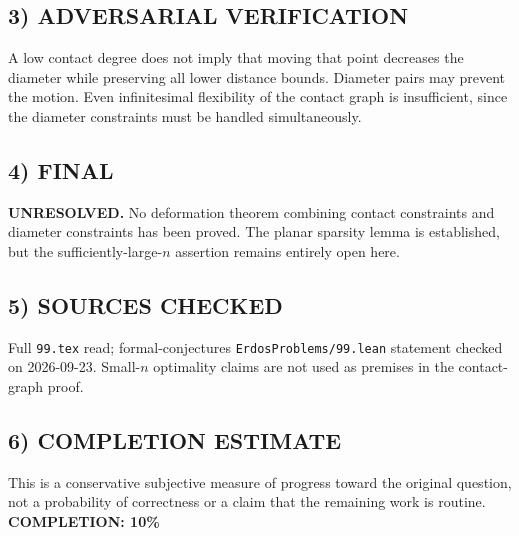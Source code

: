 \subsection{3) ADVERSARIAL VERIFICATION}
A low contact degree does not imply that moving that point decreases the diameter while preserving all lower distance bounds. Diameter pairs may prevent the motion. Even infinitesimal flexibility of the contact graph is insufficient, since the diameter constraints must be handled simultaneously.
\subsection{4) FINAL}
\textbf{UNRESOLVED.}
No deformation theorem combining contact constraints and diameter constraints has been proved. The planar sparsity lemma is established, but the sufficiently-large-$n$ assertion remains entirely open here.
\subsection{5) SOURCES CHECKED}
Full \texttt{99.tex} read; formal-conjectures \texttt{ErdosProblems/99.lean} statement checked on 2026-09-23. Small-$n$ optimality claims are not used as premises in the contact-graph proof.
\subsection{6) COMPLETION ESTIMATE}
This is a conservative subjective measure of progress toward the original question, not a probability of correctness or a claim that the remaining work is routine.
\textbf{COMPLETION: 10\%}
